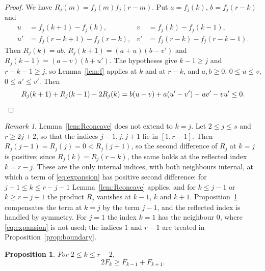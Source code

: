 \documentclass{amsart}
\newtheorem{proposition}[theorem]{Proposition}
\theoremstyle{remark}
\newtheorem{remark}[theorem]{Remark}
\numberwithin{equation}{section}
\begin{document}
\begin{proof}
We have $R_j(m)=f_j(m)f_j(r-m)$. Put $a=f_j(k)$, $b=f_j(r-k)$ and
\begin{align*}
  u&=f_j(k+1)-f_j(k), & v&=f_j(k)-f_j(k-1),\\
  u'&=f_j(r-k+1)-f_j(r-k), & v'&=f_j(r-k)-f_j(r-k-1).
\end{align*}
Then $R_j(k)=ab$, $R_j(k+1)=(a+u)(b-v')$ and $R_j(k-1)=(a-v)(b+u')$. The hypotheses give $k-1\ge j$ and $r-k-1\ge j$, so Lemma~\ref{lem:f} applies at $k$ and at $r-k$, and $a,b\ge0$, $0\le u\le v$, $0\le u'\le v'$. Then
\[
  R_j(k+1)+R_j(k-1)-2R_j(k)=b(u-v)+a(u'-v')-uv'-vu'\le0.\qedhere
\]
\end{proof}

\begin{remark}
Lemma~\ref{lem:Rconcave} does not extend to $k=j$. Let $2\le j\le s$ and $r\ge2j+2$, so that the indices $j-1,j,j+1$ lie in $[1,r-1]$. Then $R_j(j-1)=R_j(j)=0<R_j(j+1)$, so the second difference of $R_j$ at $k=j$ is positive; since $R_j(k)=R_j(r-k)$, the same holds at the reflected index $k=r-j$. These are the only internal indices, with both neighbours internal, at which a term of \eqref{eq:expansion} has positive second difference: for $j+1\le k\le r-j-1$ Lemma~\ref{lem:Rconcave} applies, and for $k\le j-1$ or $k\ge r-j+1$ the product $R_j$ vanishes at $k-1$, $k$ and $k+1$. Proposition~\ref{prop:interior} compensates the term at $k=j$ by the term $j-1$, and the reflected index is handled by symmetry. For $j=1$ the index $k=1$ has the neighbour $0$, where \eqref{eq:expansion} is not used; the indices $1$ and $r-1$ are treated in Proposition~\ref{prop:boundary}.
\end{remark}

\begin{proposition}\label{prop:interior}
For $2\le k\le r-2$,
\[
  2F_k\ge F_{k-1}+F_{k+1}.
\]
\end{proposition}
\end{document}
